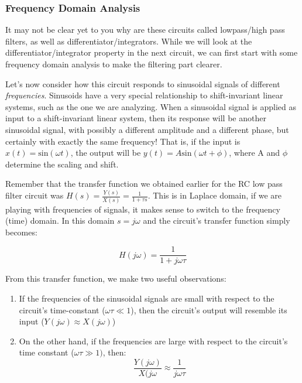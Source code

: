 \subsubsection{Frequency Domain Analysis}

It may not be clear yet to you why are these circuits called lowpass/high pass filters, as well as differentiator/integrators. While we will look at the differentiator/integrator property in the next circuit, we can first start with some frequency domain analysis to make the filtering part clearer. 

Let's now consider how this circuit responds to sinusoidal signals of different \textit{frequencies}. Sinusoids have a very special relationship to shift-invariant linear systems, such as the one we are analyzing. When a sinusoidal signal is applied as input to a shift-invariant linear system, then its response will be another sinusoidal signal, with possibly a different amplitude and a different phase, but certainly with exactly the same frequency! That is, if the input is $x(t) = \mathrm{sin}(\omega t)$, the output will be $y(t) = A \mathrm{sin}(\omega t + \phi)$, where A and $\phi$ determine the scaling and shift.

Remember that the transfer function we obtained earlier for the RC low pass filter circuit was $H(s) = \frac{Y(s)}{X(s)} = \frac{1}{1 + \tau s}$. This is in Laplace domain, if we are playing with frequencies of signals, it makes sense to switch to the frequency (time) domain. In this domain $s = j \omega$ and the circuit's transfer function simply becomes: 

\begin{equation}
    H(j \omega) = \frac{1}{1 + j \omega \tau}
\end{equation}

From this transfer function, we make two useful observations: 

\begin{enumerate}
    \item If the frequencies of the sinusoidal signals are small with respect to the circuit’s time-constant ($\omega \tau \ll 1$), then the circuit’s output will resemble its input ($Y (j \omega) \approx X(j \omega)$) 
    \item On the other hand, if the frequencies are large with respect to the circuit's time constant ($\omega \tau \gg 1)$, then: 
    \begin{equation}
        \frac{Y(j \omega)}{X(j\omega} \approx \frac{1}{j \omega \tau}
    \end{equation}
\end{enumerate}

